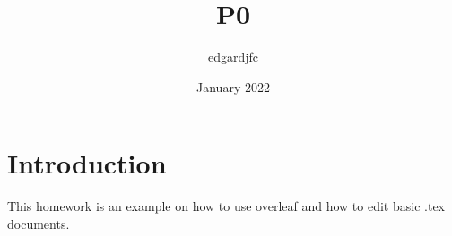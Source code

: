 \documentclass{article}
\title{P0}
\author{edgardjfc }
\date{January 2022}
\begin{document}
\maketitle

\section{Introduction}

This homework is an example on how to use overleaf and how to edit basic .tex documents.
\end{document}
